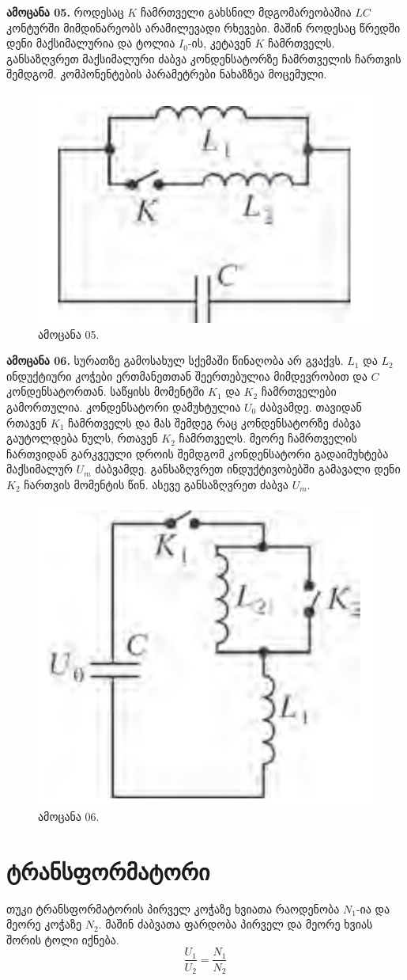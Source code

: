 \documentclass{book}
\begin{document}
\textbf{ამოცანა 05.} როდესაც $K$ ჩამრთველი გახსნილ მდგომარეობაშია $LC$ კონტურში მიმდინარეობს არამილევადი რხევები. მაშინ როდესაც წრედში დენი მაქსიმალურია და ტოლია $I_0$-ის, კეტავენ $K$ ჩამრთველს. განსაზღვრეთ მაქსიმალური ძაბვა კონდენსატორზე ჩამრთველის ჩართვის შემდგომ. კომპონენტების პარამეტრები ნახაზზეა მოცემული.
	\begin{figure}[H]
		\centering
		\includegraphics[width=0.2\columnwidth]{figures/Screenshot 2022-11-12 000506}
		\caption{ამოცანა 05.}
	\end{figure}

\textbf{ამოცანა 06.} სურათზე გამოსახულ სქემაში წინაღობა არ გვაქვს. $L_1$ და $L_2$ ინდუქტიური კოჭები ერთმანეთთან შეერთებულია მიმდევრობით და $C$ კონდენსატორთან. საწყისს მომენტში $K_1$ და $K_2$ ჩამრთველები გამორთულია. კონდენსატორი დამუხტულია $U_0$ ძაბვამდე. თავიდან რთავენ $K_1$ ჩამრთველს და მას შემდეგ რაც კონდენსატორზე ძაბვა გაუტოლდება ნულს, რთავენ $K_2$ ჩამრთველს. მეორე ჩამრთველის ჩართვიდან გარკვეული დროის შემდგომ კონდენსატორი გადაიმუხტება მაქსიმალურ $U_m$ ძაბვამდე. განსაზღვრეთ ინდუქტივობებში გამავალი დენი $K_2$ ჩართვის მომენტის წინ. ასევე განსაზღვრეთ ძაბვა $U_m$.  
	\begin{figure}[H]
		\centering
		\includegraphics[width=0.2\columnwidth]{figures/Screenshot 2022-11-12 002156}
		\caption{ამოცანა 06.}
	\end{figure}

\section{ტრანსფორმატორი}
თუკი ტრანსფორმატორის პირველ კოჭაზე ხვიათა რაოდენობა $N_1$-ია და მეორე კოჭაზე $N_2$. მაშინ ძაბვათა ფარდობა პირველ და მეორე ხვიას შორის ტოლი იქნება.
	\begin{equation}
		\dfrac{U_1}{U_2} = \dfrac{N_1}{N_2}
	\end{equation}
\end{document}
